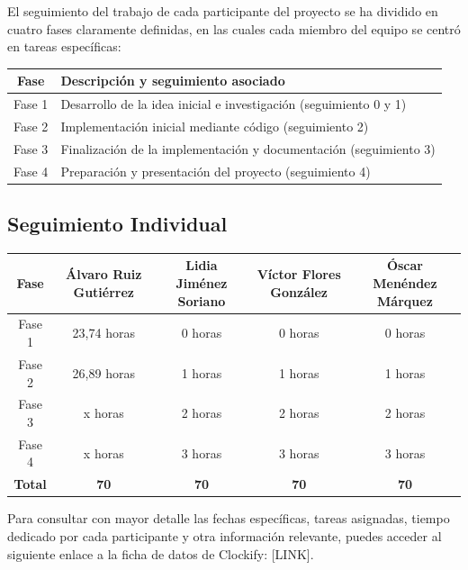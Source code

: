 \documentclass[a4paper]{article}
\begin{document}
El seguimiento del trabajo de cada participante del proyecto se ha dividido en cuatro fases claramente definidas, en las cuales cada miembro del equipo se centró en tareas específicas:
\begin{center}
  \begin{tabular}{|c|l|}
  \hline
  \textbf{Fase} & \textbf{Descripción y seguimiento asociado} \\
  \hline
  Fase 1 & Desarrollo de la idea inicial e investigación (seguimiento 0 y 1) \\
  Fase 2 & Implementación inicial mediante código (seguimiento 2) \\
  Fase 3 & Finalización de la implementación y documentación (seguimiento 3) \\
  Fase 4 & Preparación y presentación del proyecto (seguimiento 4) \\
  \hline
  \end{tabular}
  \end{center}

  \subsection*{Seguimiento Individual}

  \begin{center}
  \begin{tabular}{|c|c|c|c|c|}
  \hline
  Fase & Álvaro Ruiz Gutiérrez & Lidia Jiménez Soriano & Víctor Flores González & Óscar Menéndez Márquez \\
  \hline
  Fase 1 & 23,74 horas & 0 horas& 0 horas& 0 horas\\
  Fase 2 & 26,89 horas & 1 horas& 1 horas& 1 horas\\
  Fase 3 & x horas& 2 horas & 2 horas& 2 horas\\
  Fase 4 & x horas& 3 horas & 3 horas& 3 horas\\
  \hline
  \textbf{Total} & \textbf{70} & \textbf{70} & \textbf{70} & \textbf{70} \\
  \hline
  \end{tabular}
  \end{center}
  

Para consultar con mayor detalle las fechas específicas, tareas asignadas, tiempo dedicado por cada participante y otra información relevante, puedes acceder al siguiente enlace a la ficha de datos de Clockify: [LINK].
\newpage
\end{document}
